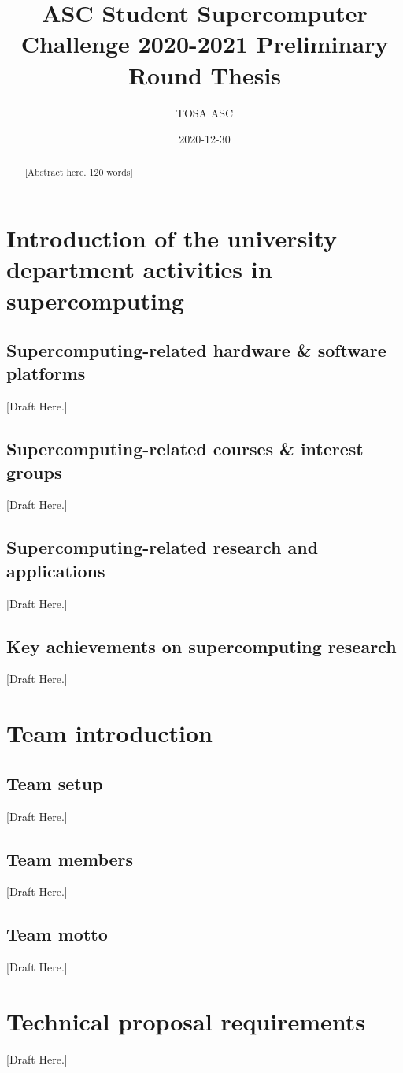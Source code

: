 \documentclass[a4paper, 11pt]{article}
\title{ASC Student Supercomputer Challenge 2020-2021 Preliminary Round Thesis}
\author{TOSA ASC}
\date{2020-12-30}
\begin{document}
	\maketitle
	
	\begin{abstract}
		[Abstract here. 120 words]
	\end{abstract}
	
	\tableofcontents
	\newpage
	
	

	\section{Introduction of the university department activities in supercomputing}
		\subsection{Supercomputing-related hardware \& software platforms} [Draft Here.]
		\subsection{Supercomputing-related courses \& interest groups} [Draft Here.]
		\subsection{Supercomputing-related research and applications} [Draft Here.]
		\subsection{Key achievements on supercomputing research} [Draft Here.]
	\section{Team introduction}
		\subsection{Team setup} [Draft Here.]
		\subsection{Team members} [Draft Here.]
		\subsection{Team motto} [Draft Here.]
		
	\section{Technical proposal requirements}
		[Draft Here.]
\end{document}
